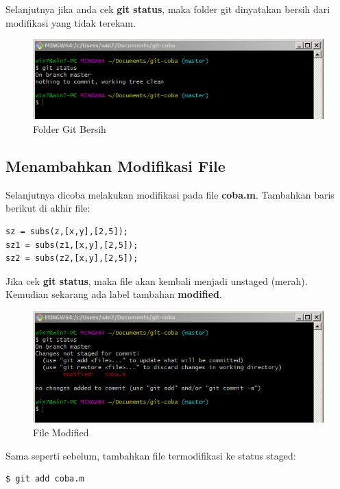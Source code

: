 \documentclass[12pt]{book}
\begin{document}
	\newpage
	Selanjutnya jika anda cek \textbf{git status}, maka folder git dinyatakan bersih dari modifikasi yang tidak terekam.
	
	\begin{figure}[!ht]
		\centering
		\includegraphics[width=400pt]{images/git6}
		\caption{Folder Git Bersih}
	\end{figure}

	\subsection{Menambahkan Modifikasi File}
	
	Selanjutnya dicoba melakukan modifikasi pada file \textbf{coba.m}.
	Tambahkan baris berikut di akhir file:
	\begin{verbatim}
sz = subs(z,[x,y],[2,5]);
sz1 = subs(z1,[x,y],[2,5]);
sz2 = subs(z2,[x,y],[2,5]);
	\end{verbatim}

	Jika cek \textbf{git status}, maka file akan kembali menjadi unstaged (merah).
	Kemudian sekarang ada label tambahan \textbf{modified}.
	
	\begin{figure}[!ht]
		\centering
		\includegraphics[width=400pt]{images/git7}
		\caption{File Modified}
	\end{figure}

	Sama seperti sebelum, tambahkan file termodifikasi ke status staged:
	\begin{verbatim}
$ git add coba.m
	\end{verbatim}
\end{document}
